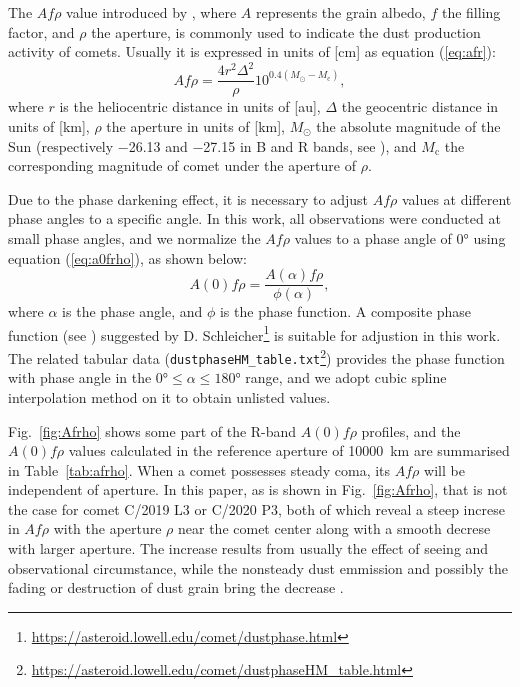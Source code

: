 The $Af\rho$ value introduced by \citet{ahearn_comet_1984}, where $A$ represents the grain albedo, $f$ the filling factor, and $\rho$ the aperture, is commonly used to indicate the dust production activity of comets. Usually it is expressed in units of [\unit{\cm}] as equation (\ref{eq:afr}): 
\begin{equation}
    Af\rho = \frac{4 r^2 \Delta^2}{\rho} 10^{0.4(M_\odot - M_\mathrm{c})}, 
    \label{eq:afr}
\end{equation}
where $r$ is the heliocentric distance in units of [\unit{\astronomicalunit}], $\Delta$ the geocentric distance in units of [\unit{\km}], $\rho$ the aperture in units of [\unit{\km}], $M_\odot$ the absolute magnitude of the Sun (respectively \num{-26.13} and \num{-27.15} in B and R bands, see \citealt{willmer_absolute_2018}), and $M_\mathrm{c}$ the corresponding magnitude of comet under the aperture of $\rho$. 

Due to the phase darkening effect, it is necessary to adjust $Af\rho$ values at different phase angles to a specific angle. In this work, all observations were conducted at small phase angles, and we normalize the $Af\rho$ values to a phase angle of \ang{0} using equation (\ref{eq:a0frho}), as shown below:
\begin{equation}
    A(0)f\rho = \frac{A(\alpha)f\rho}{\phi(\alpha)}, \label{eq:a0frho}
\end{equation}
where $\alpha$ is the phase angle, and $\phi$ is the phase function. A composite phase function (see \citealt{schleicher_composition_2011, marcus_forward-scattering_2007}) suggested by D. Schleicher\footnote{\url{https://asteroid.lowell.edu/comet/dustphase.html}} is suitable for adjustion in this work. The related tabular data (\verb|dustphaseHM_table.txt|\footnote{\url{https://asteroid.lowell.edu/comet/dustphaseHM_table.html}}) provides the phase function with phase angle in the $\ang{0} \leqslant \alpha \leqslant \ang{180}$ range, and we adopt cubic spline interpolation method on it to obtain unlisted values. 

Fig.~\ref{fig:Afrho} shows some part of the R-band $A(0)f\rho$ profiles, and the $A(0)f\rho$ values calculated in the reference aperture  of \qty{10000}{\km} are summarised in Table~\ref{tab:afrho}. When a comet possesses steady coma, its $Af\rho$ will be independent of aperture. In this paper, as is shown in Fig.~\ref{fig:Afrho}, that is not the case for comet C/2019 L3 or C/2020 P3, both of which reveal a steep increse in $Af\rho$ with the aperture $\rho$ near the comet center along with a smooth decrese with larger aperture. The increase results from usually the effect of seeing and observational circumstance, while the nonsteady dust emmission and possibly the fading or destruction of dust grain bring the decrease \citep{lara_behaviour_2003,tozzi_imaging_2003}.  


